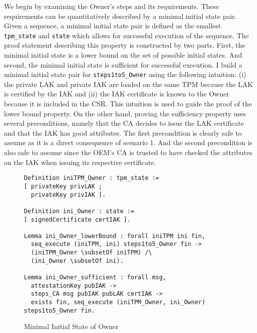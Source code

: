 We begin by examining the Owner's steps and its requirements. These requirements can be quantitatively described by a minimal initial state pair. Given a sequence, a minimal initial state pair is defined as the smallest \verb|tpm_state| and \verb|state| which allows for successful execution of the sequence. The proof statement describing this property is constructed by two parts. First, the minimal initial state is a lower bound on the set of possible initial states. And second, the minimal initial state is sufficient for successful execution. I build a minimal initial state pair for \verb|steps1to5_Owner| using the following intuition: (i) the private LAK and private IAK are loaded on the same TPM because the LAK is certified by the IAK and (ii) the IAK certificate is known to the Owner because it is included in the CSR.  
This intuition is used to guide the proof of the lower bound property.
On the other hand, proving the sufficiency property uses several preconditions, namely that the CA decides to issue the LAK certificate and that the IAK has good attributes.
The first precondition is clearly safe to assume as it is a direct consequence of scenario 1.
And the second precondition is also safe to assume since the OEM's CA is trusted to have checked the attributes on the IAK when issuing its respective certificate.
\begin{figure}[h]
\begin{lstlisting}[language=Coq]
Definition iniTPM_Owner : tpm_state :=
[ privateKey privLAK ;
  privateKey privIAK ].

Definition ini_Owner : state :=
[ signedCertificate certIAK ].

Lemma ini_Owner_lowerBound : forall iniTPM ini fin,
  seq_execute (iniTPM, ini) steps1to5_Owner fin ->
  (iniTPM_Owner \subsetOf iniTPM) /\
  (ini_Owner \subsetOf ini).

Lemma ini_Owner_sufficient : forall msg,
  attestationKey pubIAK ->
  steps_CA msg pubIAK pubLAK certIAK ->
  exists fin, seq_execute (iniTPM_Owner, ini_Owner) steps1to5_Owner fin.
\end{lstlisting}
\caption{Minimal Initial State of Owner}
\end{figure}
